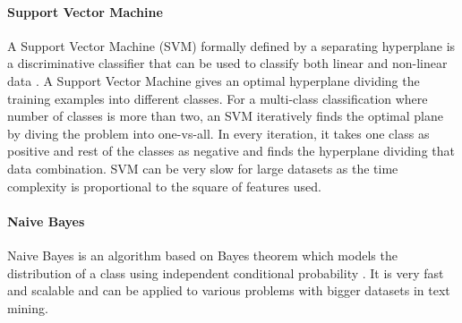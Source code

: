 
\paragraph{Support Vector Machine}\label{svm}
A Support Vector Machine (SVM) formally defined by a separating hyperplane is a discriminative classifier that can be used to classify both linear and non-linear data \cite{vapnik2013nature}. A Support Vector Machine gives an optimal hyperplane dividing the training examples into different classes. For a multi-class classification where number of classes is more than two, an SVM iteratively finds the optimal plane by diving the problem into one-vs-all. In every iteration, it takes one class as positive and rest of the classes as negative and finds the hyperplane dividing that data combination. SVM can be very slow for large datasets as the time complexity is proportional to the square of features used.

\paragraph{Naive Bayes}
Naive Bayes is an algorithm based on Bayes theorem which models the distribution of a class using independent conditional probability \cite{han2011data}. It is very fast and scalable and can be applied to various problems with bigger datasets in text mining.

